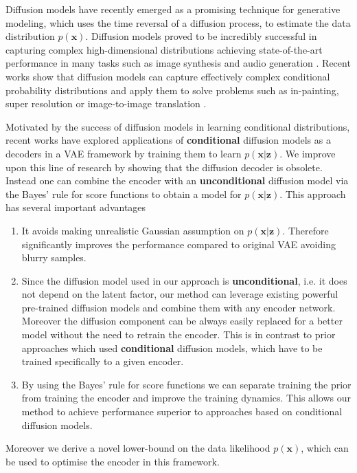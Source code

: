Diffusion models \cite{diffusion_models, ddpm} have recently emerged as a promising technique for generative modeling, which uses the time reversal of a diffusion process, to estimate the data distribution $p(\textbf{x})$. Diffusion models proved to be incredibly successful in capturing complex high-dimensional distributions achieving state-of-the-art performance in many tasks such as image synthesis \cite{dhariwal2021diffusion_beats_gans} and audio generation \cite{kong2020diffWave}. Recent works show that diffusion models can capture effectively complex conditional probability distributions and apply them to solve problems such as in-painting, super resolution or image-to-image translation \cite{batzolis2022non_uniform, saharia2021sr3}.

Motivated by the success of diffusion models in learning conditional distributions, recent works \cite{preechakul2022diffusion_decoder, yang2023ldiffusion_decoder_compression} have explored applications of \textbf{conditional} diffusion models as a decoders in a VAE framework by training them to learn $p(\textbf{x} | \textbf{z})$. We improve upon this line of research by  showing that the diffusion decoder is obsolete. Instead one can combine the encoder with an \textbf{unconditional} diffusion model via the Bayes' rule for score functions to obtain a model for $p(\textbf{x}| \textbf{z})$.
This approach has several important advantages

\begin{enumerate}
    \item It avoids making unrealistic Gaussian assumption on $p(\textbf{x} | \textbf{z})$. Therefore significantly improves the performance compared to original VAE avoiding blurry samples.
    \item Since the diffusion model used in our approach is \textbf{unconditional}, i.e. it does not depend on the latent factor, our method can leverage existing powerful pre-trained  diffusion models and combine them with any encoder network. Moreover the diffusion component can be always easily replaced for a better model without the need to retrain the encoder. This is in contrast to prior approaches which used \textbf{conditional} diffusion models, which have to be trained specifically to a given encoder.
    \item By using the Bayes' rule for score functions we can separate training the prior from training the encoder and improve the training dynamics. This allows our method to achieve performance superior to approaches based on conditional diffusion models.
\end{enumerate}
Moreover we derive a novel lower-bound on the data likelihood $p(\textbf{x})$, which can be used to optimise the encoder in this framework.

